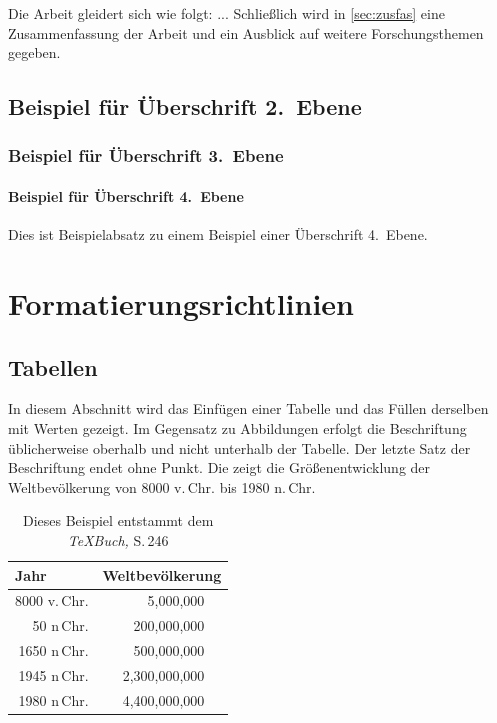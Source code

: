 \documentclass[runningheads,a4paper]{llncs}[2015/06/24]
\begin{document}
Die Arbeit gleidert sich wie folgt:
...
Schließlich wird in \cref{sec:zusfas} eine Zusammenfassung der Arbeit und ein Ausblick auf weitere Forschungsthemen gegeben.

\subsection{Beispiel für Überschrift 2.~Ebene}

\subsubsection{Beispiel für Überschrift 3.~Ebene}

\paragraph{Beispiel für Überschrift 4.~Ebene}
Dies ist Beispielabsatz zu einem Beispiel einer Überschrift 4.~Ebene.

\section{Formatierungsrichtlinien}

\subsection{Tabellen}
In diesem Abschnitt wird das Einfügen einer Tabelle und das Füllen derselben mit Werten gezeigt.
Im Gegensatz zu Abbildungen erfolgt die Beschriftung üblicherweise oberhalb und nicht unterhalb der Tabelle.
Der letzte Satz der Beschriftung endet ohne Punkt.
Die  zeigt die Größenentwicklung der Weltbevölkerung von 8000 v.\,Chr. bis 1980 n.\,Chr.

\begin{table}
\caption{Dieses Beispiel entstammt dem {\it\TeX{}Buch,} S.\,246}
\label{tab:bsp}
\begin{center}
\begin{tabular}{r@{\quad}rl}
\hline
\multicolumn{1}{l}{\rule{0pt}{12pt}
                   Jahr}&\multicolumn{2}{l}{Weltbevölkerung}\\[2pt]
\hline\rule{0pt}{12pt}
8000 v.\,Chr. &     5,000,000& \\
  50 n\,Chr. &   200,000,000& \\
1650 n\,Chr. &   500,000,000& \\
1945 n\,Chr. & 2,300,000,000& \\
1980 n\,Chr. & 4,400,000,000& \\[2pt]
\hline
\end{tabular}
\end{center}
\end{table}
\end{document}
